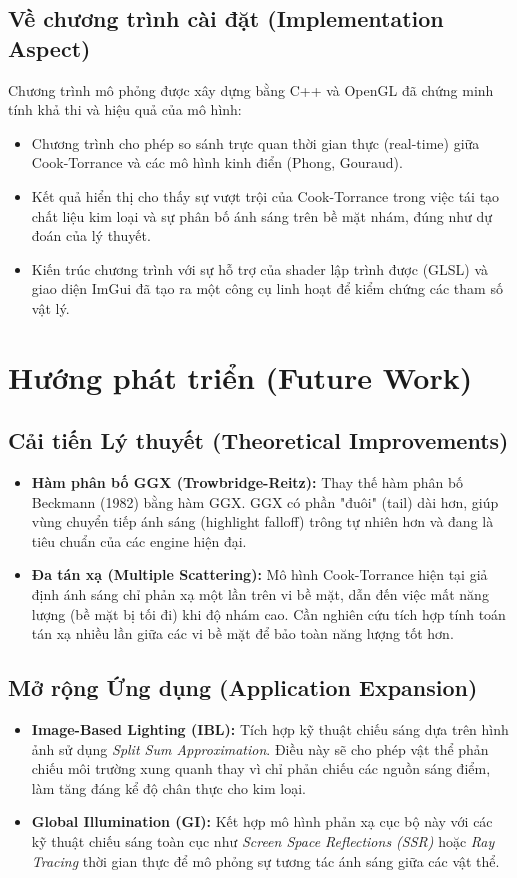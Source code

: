\subsection{Về chương trình cài đặt (Implementation Aspect)}
Chương trình mô phỏng được xây dựng bằng C++ và OpenGL đã chứng minh tính khả thi và hiệu quả của mô hình:
\begin{itemize}
	\item Chương trình cho phép so sánh trực quan thời gian thực (real-time) giữa Cook-Torrance và các mô hình kinh điển (Phong, Gouraud).
	\item Kết quả hiển thị cho thấy sự vượt trội của Cook-Torrance trong việc tái tạo chất liệu kim loại và sự phân bố ánh sáng trên bề mặt nhám, đúng như dự đoán của lý thuyết.
	\item Kiến trúc chương trình với sự hỗ trợ của shader lập trình được (GLSL) và giao diện ImGui đã tạo ra một công cụ linh hoạt để kiểm chứng các tham số vật lý.
\end{itemize}

\section{Hướng phát triển (Future Work)}

\subsection{Cải tiến Lý thuyết (Theoretical Improvements)}
\begin{itemize}
	\item \textbf{Hàm phân bố GGX (Trowbridge-Reitz):} Thay thế hàm phân bố Beckmann (1982) bằng hàm GGX. GGX có phần "đuôi" (tail) dài hơn, giúp vùng chuyển tiếp ánh sáng (highlight falloff) trông tự nhiên hơn và đang là tiêu chuẩn của các engine hiện đại.
	\item \textbf{Đa tán xạ (Multiple Scattering):} Mô hình Cook-Torrance hiện tại giả định ánh sáng chỉ phản xạ một lần trên vi bề mặt, dẫn đến việc mất năng lượng (bề mặt bị tối đi) khi độ nhám cao. Cần nghiên cứu tích hợp tính toán tán xạ nhiều lần giữa các vi bề mặt để bảo toàn năng lượng tốt hơn.
\end{itemize}

\subsection{Mở rộng Ứng dụng (Application Expansion)}
\begin{itemize}
	\item \textbf{Image-Based Lighting (IBL):} Tích hợp kỹ thuật chiếu sáng dựa trên hình ảnh sử dụng \textit{Split Sum Approximation}. Điều này sẽ cho phép vật thể phản chiếu môi trường xung quanh thay vì chỉ phản chiếu các nguồn sáng điểm, làm tăng đáng kể độ chân thực cho kim loại.
	\item \textbf{Global Illumination (GI):} Kết hợp mô hình phản xạ cục bộ này với các kỹ thuật chiếu sáng toàn cục như \textit{Screen Space Reflections (SSR)} hoặc \textit{Ray Tracing} thời gian thực để mô phỏng sự tương tác ánh sáng giữa các vật thể.
\end{itemize}

